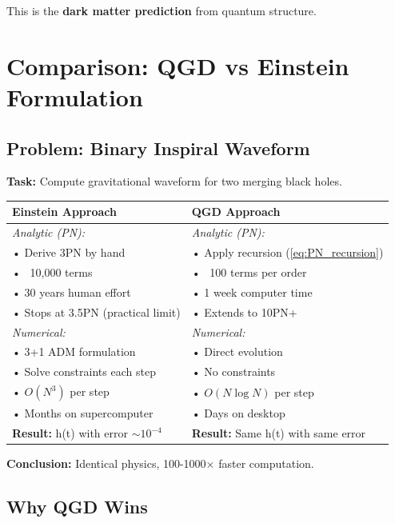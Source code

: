 \documentclass[11pt,a4paper]{article}
\theoremstyle{definition}
\theoremstyle{remark}
\begin{document}
		This is the \textbf{dark matter prediction} from quantum structure.
		
		\section{Comparison: QGD vs Einstein Formulation}
		
		\subsection{Problem: Binary Inspiral Waveform}
		
		\textbf{Task:} Compute gravitational waveform for two merging black holes.
		
		\begin{table}[h]
			\centering
			\begin{tabular}{@{}p{0.45\textwidth}p{}@{}}
				\toprule
				\textbf{Einstein Approach} & \textbf{QGD Approach} \\
				\midrule
				\textit{Analytic (PN):} & \textit{Analytic (PN):} \\
				• Derive 3PN by hand & • Apply recursion (\ref{eq:PN_recursion}) \\
				• ~10,000 terms & • ~100 terms per order \\
				• 30 years human effort & • 1 week computer time \\
				• Stops at 3.5PN (practical limit) & • Extends to 10PN+ \\
				\midrule
				\textit{Numerical:} & \textit{Numerical:} \\
				• 3+1 ADM formulation & • Direct evolution \\
				• Solve constraints each step & • No constraints \\
				• $O(N^3)$ per step & • $O(N\log N)$ per step \\
				• Months on supercomputer & • Days on desktop \\
				\midrule
				\textbf{Result:} h(t) with error $\sim 10^{-4}$ & \textbf{Result:} Same h(t) with same error \\
				\bottomrule
			\end{tabular}
		\end{table}
		
		\textbf{Conclusion:} Identical physics, 100-1000× faster computation.
		
		\subsection{Why QGD Wins}
		
\end{document}
